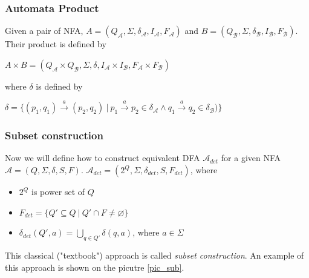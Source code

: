       \subsubsection{Automata Product}
      \label{defAutProd}
      Given a pair of NFA, $A=(Q_\mathcal{A},\Sigma,\delta_\mathcal{A},I_\mathcal{A},F_\mathcal{A})$ 
      and $B=(Q_\mathcal{B},\Sigma,\delta_\mathcal{B},I_\mathcal{B},F_\mathcal{B})$. Their product is defined by
      \begin{description}
        \item $A \times B=(Q_\mathcal{A}\times Q_\mathcal{B},\Sigma,\delta,I_\mathcal{A}\times I_\mathcal{B},F_\mathcal{A}\times F_\mathcal{B})$\
      \end{description}
      where $\delta$ is defined by
      \begin{description}
        \item $\delta = 
        \{(p_1,q_1) \xrightarrow{a} (p_2,q_2)\ |\ p_1 \xrightarrow{a} p_2 \in \delta_\mathcal{A} \wedge q_1 \xrightarrow{a} q_2 \in \delta_\mathcal{B})\}$\
      \end{description}

  \subsubsection{Subset construction}
	\label{subset}
	Now we will define how to construct equivalent DFA $\mathcal{A}_{det}$ for a given NFA $\mathcal{A}=(Q,\Sigma,\delta,S,F)$. 
  \newline
  \newline
	\label{defSubset}
	$\mathcal{A}_{det}=(2^Q,\Sigma,\delta_{det},S,F_{det})$, where
	\begin{itemize}
		\item $2^Q$ is power set of $Q$
		\item $F_{det}=\{Q'\subseteq Q\ |\ Q'\cap F \not = \varnothing\}$
		\item $\delta_{det}(Q',a)=\bigcup\limits_{q\in Q'}\delta(q,a)$, where $a\in\Sigma$
	\end{itemize}

  This classical ("textbook") approach is called \emph{subset construction}.
    An example of this approach is shown on the picutre \ref{pic_sub}.
	

